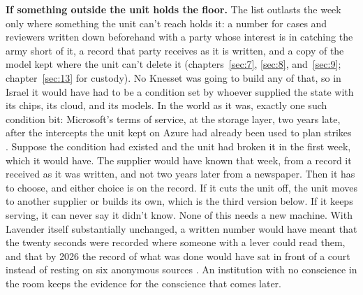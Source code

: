 \textbf{If something outside the unit holds the floor.} The list outlasts the week only where something the unit can't reach holds it: a number for cases and reviewers written down beforehand with a party whose interest is in catching the army short of it, a record that party receives as it is written, and a copy of the model kept where the unit can't delete it (chapters~\ref{sec:7}, \ref{sec:8}, and~\ref{sec:9}; chapter~\ref{sec:13} for custody). No Knesset was going to build any of that, so in Israel it would have had to be a condition set by whoever supplied the state with its chips, its cloud, and its models. In the world as it was, exactly one such condition bit: Microsoft's terms of service, at the storage layer, two years late, after the intercepts the unit kept on Azure had already been used to plan strikes \autocite{abraham2025azure,fabian2025microsoft}. Suppose the condition had existed and the unit had broken it in the first week, which it would have. The supplier would have known that week, from a record it received as it was written, and not two years later from a newspaper. Then it has to choose, and either choice is on the record. If it cuts the unit off, the unit moves to another supplier or builds its own, which is the third version below. If it keeps serving, it can never say it didn't know. None of this needs a new machine. With Lavender itself substantially unchanged, a written number would have meant that the twenty seconds were recorded where someone with a lever could read them, and that by 2026 the record of what was done would have sat in front of a court instead of resting on six anonymous sources \autocite{abraham2024lavender}. An institution with no conscience in the room keeps the evidence for the conscience that comes later.

